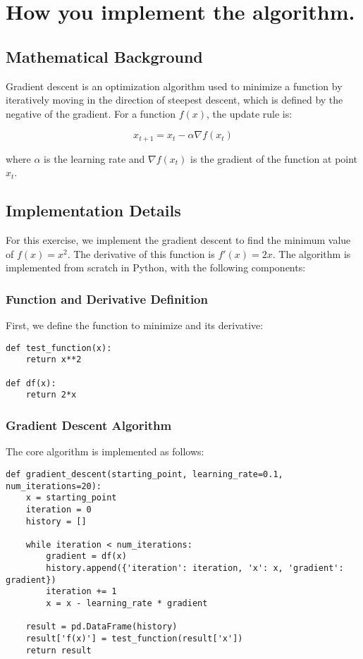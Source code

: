 \documentclass[hidelinks]{report}
\begin{document}
\chapter{How you implement the algorithm.}

\section{Mathematical Background}
Gradient descent is an optimization algorithm used to minimize a function by iteratively moving in the direction of steepest descent, which is defined by the negative of the gradient. For a function $f(x)$, the update rule is:

\begin{equation}
x_{t+1} = x_t - \alpha \nabla f(x_t)
\end{equation}

where $\alpha$ is the learning rate and $\nabla f(x_t)$ is the gradient of the function at point $x_t$.

\section{Implementation Details}
\noindent For this exercise, we implement the gradient descent to find the minimum value of $f(x) = x^2$. The derivative of this function is $f'(x) = 2x$. The algorithm is implemented from scratch in Python, with the following components:

\subsection{Function and Derivative Definition}
\noindent First, we define the function to minimize and its derivative:

\begin{verbatim}
def test_function(x):
    return x**2

def df(x):
    return 2*x
\end{verbatim}

\subsection{Gradient Descent Algorithm}
\noindent The core algorithm is implemented as follows:

\begin{verbatim}
def gradient_descent(starting_point, learning_rate=0.1, num_iterations=20):
    x = starting_point
    iteration = 0
    history = []
    
    while iteration < num_iterations:
        gradient = df(x)
        history.append({'iteration': iteration, 'x': x, 'gradient': gradient})
        iteration += 1
        x = x - learning_rate * gradient
        
    result = pd.DataFrame(history)
    result['f(x)'] = test_function(result['x'])
    return result
\end{verbatim}
\end{document}
